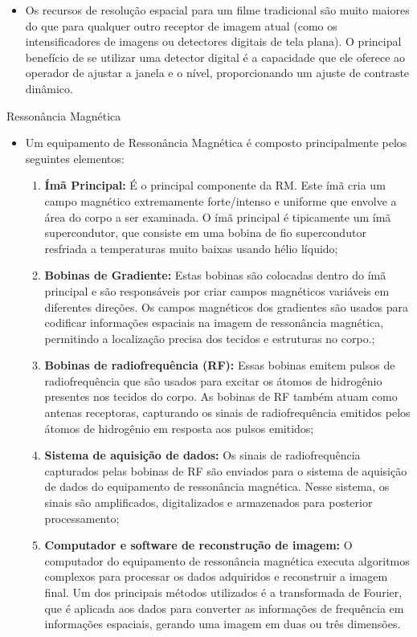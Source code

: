 \documentclass[11pt,a4paper]{article}
\newcounter{exemplo}
\begin{document}
\begin{exemplo}
\begin{itemize}
        \item Os recursos de resolução espacial para um filme tradicional são muito maiores do que para qualquer outro receptor de imagem atual (como os intensificadores de imagens ou detectores digitais de tela plana). O principal benefício de se utilizar uma detector digital é a capacidade que ele oferece ao operador de ajustar a janela e o nível, proporcionando um ajuste de contraste dinâmico.
       
    \end{itemize}

    \textcolor{CarnationPink}{Ressonância Magnética}
    \begin{itemize}
        \item Um equipamento de Ressonância Magnética é composto principalmente pelos seguintes elementos:
        \begin{enumerate}
            \item \textbf{Ímã Principal:} É o principal componente da RM. Este ímã cria um campo magnético extremamente forte/intenso e uniforme que envolve a área do corpo a ser examinada. O ímã principal é tipicamente um ímã supercondutor, que consiste em uma bobina de fio supercondutor resfriada a temperaturas muito baixas usando hélio líquido;
            \item \textbf{Bobinas de Gradiente:} Estas bobinas são colocadas dentro do ímã principal e são responsáveis por criar campos magnéticos variáveis em diferentes direções. Os campos magnéticos dos gradientes são usados para codificar informações espaciais na imagem de ressonância magnética, permitindo a localização precisa dos tecidos e estruturas no corpo.;
            \item \textbf{Bobinas de radiofrequência (RF):} Essas bobinas emitem pulsos de radiofrequência que são usados para excitar os átomos de hidrogênio presentes nos tecidos do corpo. As bobinas de RF também atuam como antenas receptoras, capturando os sinais de radiofrequência emitidos pelos átomos de hidrogênio em resposta aos pulsos emitidos;
            \item \textbf{Sistema de aquisição de dados:} Os sinais de radiofrequência capturados pelas bobinas de RF são enviados para o sistema de aquisição de dados do equipamento de ressonância magnética. Nesse sistema, os sinais são amplificados, digitalizados e armazenados para posterior processamento;
            \item \textbf{Computador e software de reconstrução de imagem:} O computador do equipamento de ressonância magnética executa algoritmos complexos para processar os dados adquiridos e reconstruir a imagem final. Um dos principais métodos utilizados é a transformada de Fourier, que é aplicada aos dados para converter as informações de frequência em informações espaciais, gerando uma imagem em duas ou três dimensões.
        \end{enumerate}
        

\end{itemize}
\end{exemplo}
\end{document}
